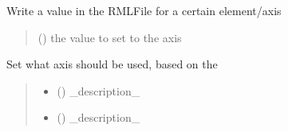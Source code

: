 \documentclass[letterpaper,10pt,english]{sphinxmanual}
\begin{document}
\begin{fulllineitems}
\begin{fulllineitems}
\label{\detokenize{API:raypyng_bluesky.axes.RaypyngAxis.set}}
\pysigstartsignatures
{}
\pysigstopsignatures
\sphinxAtStartPar
Write a value in the RMLFile for a certain element/axis
\begin{quote}\begin{description}
\sphinxAtStartPar
{} (\sphinxstyleliteralemphasis{\sphinxupquote{,}}) \textendash{} the value to set to the axis

\end{description}\end{quote}

\end{fulllineitems}


\begin{fulllineitems}
\label{\detokenize{API:raypyng_bluesky.axes.RaypyngAxis.set_axis}}
\pysigstartsignatures
{}
\pysigstopsignatures
\sphinxAtStartPar
Set what axis should be used, based on the 
\begin{quote}\begin{description}
\begin{itemize}
\item {} 
\sphinxAtStartPar
{} () \textendash{} \_description\_

\item {} 
\sphinxAtStartPar
{} () \textendash{} \_description\_

\end{itemize}

\end{description}\end{quote}

\end{fulllineitems}


\end{fulllineitems}
\end{document}
